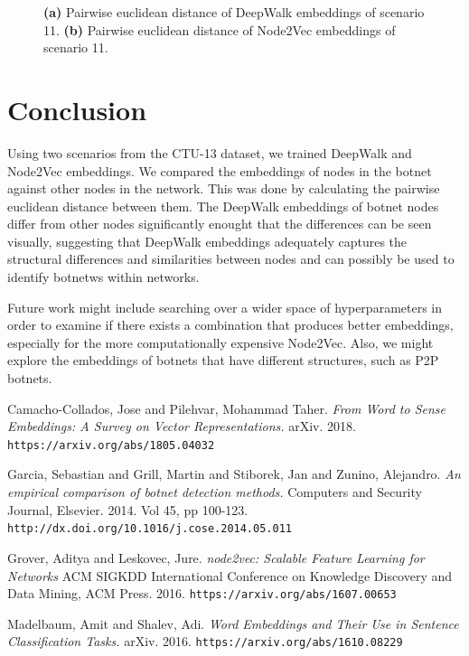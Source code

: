 \documentclass[10pt]{article}
\begin{document}
\begin{multicols}{2}
\begin{figure}[H]
\caption{\textbf{(a)} Pairwise euclidean distance of DeepWalk embeddings of scenario 11. \textbf{(b)} Pairwise euclidean distance of Node2Vec embeddings of scenario 11.}
\end{figure}

\section{Conclusion}

Using two scenarios from the CTU-13 dataset, we trained DeepWalk and Node2Vec embeddings. We compared the embeddings of nodes in the botnet against other nodes in the network. This was done by calculating the pairwise euclidean distance between them. The DeepWalk embeddings of botnet nodes differ from other nodes significantly enought that the differences can be seen visually, suggesting that DeepWalk embeddings adequately captures the structural differences and similarities between nodes and can possibly be used to identify botnetws within networks. 

Future work might include searching over a wider space of hyperparameters in order to examine if there exists a combination that produces better embeddings, especially for the more computationally expensive Node2Vec. Also, we might explore the embeddings of botnets that have different structures, such as P2P botnets. 

\begin{thebibliography}{5}

Camacho-Collados, Jose and Pilehvar, Mohammad Taher.
\textit{From Word to Sense Embeddings: A Survey on Vector Representations.}
arXiv. 2018.
\texttt{https://arxiv.org/abs/1805.04032}

Garcia, Sebastian and Grill, Martin and Stiborek, Jan and Zunino, Alejandro.
\textit{An empirical comparison of botnet detection methods.}
Computers and Security Journal, Elsevier. 2014. Vol 45, pp 100-123.
\texttt{http://dx.doi.org/10.1016/j.cose.2014.05.011}

Grover, Aditya and Leskovec, Jure.
\textit{node2vec: Scalable Feature Learning for Networks}
ACM SIGKDD International Conference on Knowledge Discovery and Data Mining, ACM Press. 2016.
\texttt{https://arxiv.org/abs/1607.00653}

Madelbaum, Amit and Shalev, Adi.
\textit{Word Embeddings and Their Use in Sentence Classification Tasks.}
arXiv. 2016. 
\texttt{https://arxiv.org/abs/1610.08229}


\end{thebibliography}
\end{multicols}
\end{document}
